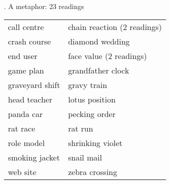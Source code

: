 \ex. %
A metaphor: 23 readings\\
\begin{tabularx}{0.8\textwidth}{QQ}
call centre&chain reaction (2 readings)\\
crash course&diamond wedding\\
end user&face value (2 readings)\\   
game plan&grandfather clock\\
graveyard shift&gravy train\\
head teacher&lotus position\\       
panda car&pecking order\\
rat race&rat run\\
role model&shrinking violet\\         
smoking jacket&snail mail\\
web site&zebra crossing\\ 
\end{tabularx}

